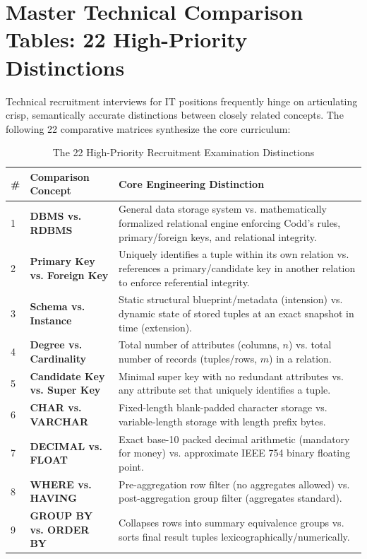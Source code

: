 \section{Master Technical Comparison Tables: 22 High-Priority Distinctions}
\label{sec:dbms_master_comparisons}

Technical recruitment interviews for IT positions frequently hinge on articulating crisp, semantically accurate distinctions between closely related concepts. The following 22 comparative matrices synthesize the core curriculum:

\begin{table}[htbp]
\centering
\scriptsize
\caption{The 22 High-Priority Recruitment Examination Distinctions}
\label{tab:22_distinctions}
\begin{tabularx}{\textwidth}{l p{3.2cm} X}
\toprule
\textbf{\#} & \textbf{Comparison Concept} & \textbf{Core Engineering Distinction} \\
\midrule
1 & \textbf{DBMS vs. RDBMS} & General data storage system vs. mathematically formalized relational engine enforcing Codd's rules, primary/foreign keys, and relational integrity. \\
2 & \textbf{Primary Key vs. Foreign Key} & Uniquely identifies a tuple within its own relation vs. references a primary/candidate key in another relation to enforce referential integrity. \\
3 & \textbf{Schema vs. Instance} & Static structural blueprint/metadata (intension) vs. dynamic state of stored tuples at an exact snapshot in time (extension). \\
4 & \textbf{Degree vs. Cardinality} & Total number of attributes (columns, $n$) vs. total number of records (tuples/rows, $m$) in a relation. \\
5 & \textbf{Candidate Key vs. Super Key} & Minimal super key with no redundant attributes vs. any attribute set that uniquely identifies a tuple. \\
6 & \textbf{CHAR vs. VARCHAR} & Fixed-length blank-padded character storage vs. variable-length storage with length prefix bytes. \\
7 & \textbf{DECIMAL vs. FLOAT} & Exact base-10 packed decimal arithmetic (mandatory for money) vs. approximate IEEE 754 binary floating point. \\
8 & \textbf{WHERE vs. HAVING} & Pre-aggregation row filter (no aggregates allowed) vs. post-aggregation group filter (aggregates standard). \\
9 & \textbf{GROUP BY vs. ORDER BY} & Collapses rows into summary equivalence groups vs. sorts final result tuples lexicographically/numerically. \\

\end{tabularx}
\end{table}
